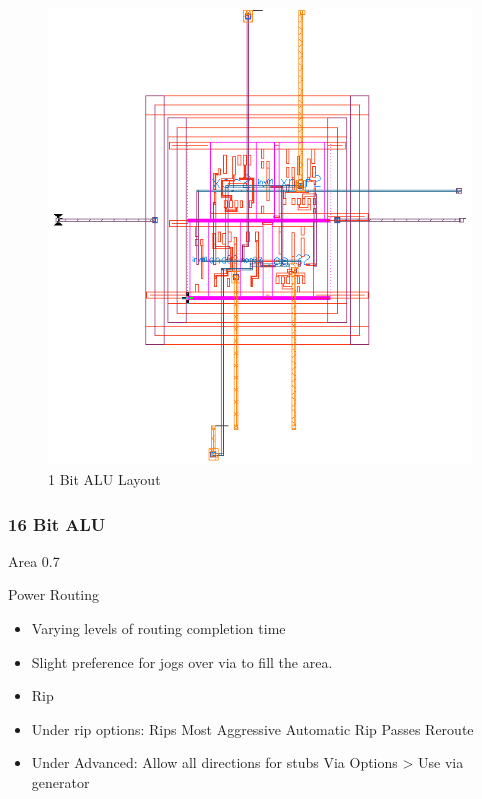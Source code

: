 \documentclass[11pt]{article}
\begin{document}
			\begin{figure}[H]
				\centering
				\includegraphics[width=0.7\linewidth]{"Pictures/ALU-1Bit Layout"}
				\caption{1 Bit ALU Layout}
				\label{fig:alu-1bit-layout}
			\end{figure}
			
	
		\subsubsection{16 Bit ALU}
			
			Area 0.7
			
			Power Routing
			\begin{itemize}
				\item Varying levels of routing completion time
				\item Slight preference for jogs over via to fill the area.
				\item Rip
				\item Under rip options: 
				\subitem Rips Most Aggressive
				\subitem Automatic Rip Passes
				\subitem Reroute
				\item Under Advanced:
				\subitem Allow all directions for stubs
				\subitem Via Options > Use via generator
			\end{itemize}
		
\end{document}
